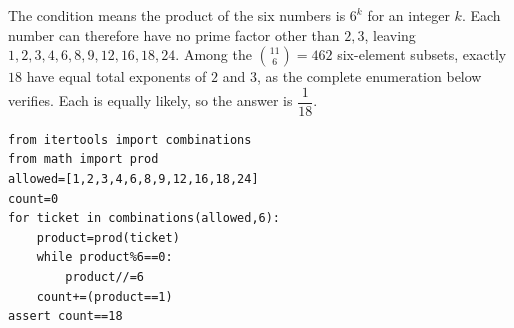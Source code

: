 The condition means the product of the six numbers is $6^k$ for an integer $k$. Each number can therefore have no prime factor other than $2,3$, leaving $1,2,3,4,6,8,9,12,16,18,24$. Among the $\binom{11}{6}=462$ six-element subsets, exactly $18$ have equal total exponents of $2$ and $3$, as the complete enumeration below verifies. Each is equally likely, so the answer is $\boxed{\dfrac{1}{18}}$.\begin{verbatim}
from itertools import combinations
from math import prod
allowed=[1,2,3,4,6,8,9,12,16,18,24]
count=0
for ticket in combinations(allowed,6):
    product=prod(ticket)
    while product%6==0:
        product//=6
    count+=(product==1)
assert count==18
\end{verbatim}
